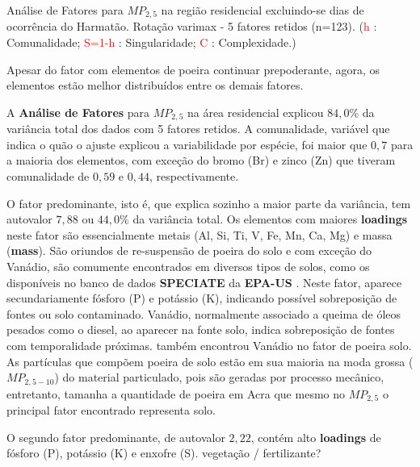 \begin{table}[H]
  
  \caption{Análise de Fatores para $MP_{2,5}$ na região residencial
           excluindo-se dias de ocorrência do Harmatão.
           Rotação varimax - 5 fatores retidos (n=123).
           (\textcolor{red}{h} : Comunalidade; 
           \textcolor{red}{S=1-h} : Singularidade; 
           \textcolor{red}{C} : Complexidade.)
           \label{table:loadings_RFsH5}}
\end{table}

Apesar do fator com elementos de poeira continuar prepoderante, agora, os 
elementos estão melhor distribuídos entre os demais fatores.  

A \textbf{Análise de Fatores} para $MP_{2,5}$ na área residencial explicou 
$84,0\%$ da variância total dos dados com 5 fatores retidos.
A comunalidade, variável que indica o quão o ajuste explicou a variabilidade por 
espécie, foi maior que $0,7$ para a maioria dos elementos,
com exceção do bromo (Br) e zinco (Zn) que tiveram comunalidade de $0,59$ e 
$0,44$, respectivamente.

O fator predominante, isto é, que explica sozinho a maior parte da variância, 
tem autovalor $7,88$ ou $44,0\%$ da variância total.
Os elementos com maiores \textbf{loadings} neste fator são essencialmente 
metais (Al, Si, Ti, V, Fe, Mn, Ca, Mg) e massa (\textbf{mass}).
São oriundos de re-suspensão de poeira do solo e com exceção do Vanádio,
são comumente encontrados em diversos tipos de solos, como os disponíveis no 
banco de dados \textbf{SPECIATE} da \textbf{EPA-US} \citep{simon2010}.
Neste fator, aparece secundariamente fósforo (P) e potássio (K), indicando 
possível sobreposição de fontes ou solo contaminado. 
Vanádio, normalmente associado a queima de óleos pesados como o diesel, ao 
aparecer na fonte solo, indica sobreposição de fontes com temporalidade próximas.
\cite{aboh2009} também encontrou Vanádio no fator de poeira solo.
As partículas que compõem poeira de solo estão em sua maioria na moda grossa 
($MP_{2,5-10}$) do material particulado, pois são geradas por processo mecânico,
entretanto, tamanha a quantidade de poeira em Acra que mesmo no $MP_{2,5}$ o 
principal fator encontrado representa solo.  

O segundo fator predominante, de autovalor $2,22$, contém alto \textbf{loadings}
de fósforo (P), potássio (K) e enxofre (S). 
vegetação / fertilizante?

